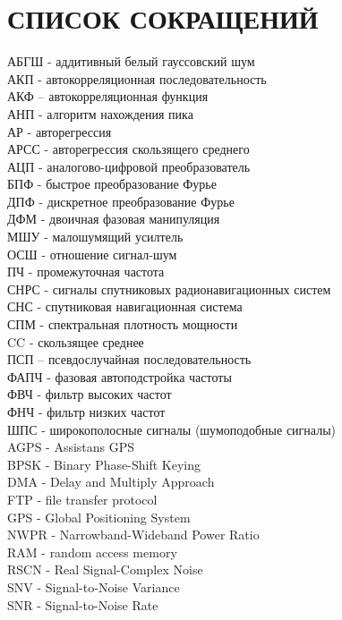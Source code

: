 \section*{СПИСОК СОКРАЩЕНИЙ}
\noindent
АБГШ - аддитивный белый гауссовский шум				\\
АКП - автокорреляционная последовательность			\\
АКФ – автокорреляционная функция				\\
АНП - алгоритм нахождения пика					\\
АР - авторегрессия						\\
АРСС - авторегрессия скользящего среднего			\\
АЦП - аналогово-цифровой преобразователь			\\
БПФ - быстрое преобразование Фурье				\\
ДПФ - дискретное преобразование Фурье				\\
ДФМ - двоичная фазовая манипуляция				\\
МШУ - малошумящий усилтель					\\
ОСШ - отношение сигнал-шум 					\\
ПЧ - промежуточная частота					\\
СНРС - сигналы спутниковых радионавигационных систем		\\
СНС - спутниковая навигационная система				\\
СПМ - спектральная плотность мощности				\\
CC - скользящее среднее						\\
ПСП – псевдослучайная последовательность			\\
ФАПЧ - фазовая автоподстройка частоты				\\
ФВЧ - фильтр высоких частот					\\
ФНЧ - фильтр низких частот					\\
ШПС -  широкополосные сигналы (шумоподобные сигналы)		\\

\noindent
AGPS - Assistans GPS						\\
BPSK - Binary Phase-Shift Keying				\\
DMA - Delay and Multiply Approach				\\
FTP - file transfer protocol					\\
GPS - Global Positioning System					\\
NWPR - Narrowband-Wideband Power Ratio				\\
RAM - random access memory					\\
RSCN - Real Signal-Complex Noise				\\
SNV - Signal-to-Noise Variance					\\
SNR - Signal-to-Noise Rate					\\

\newpage
